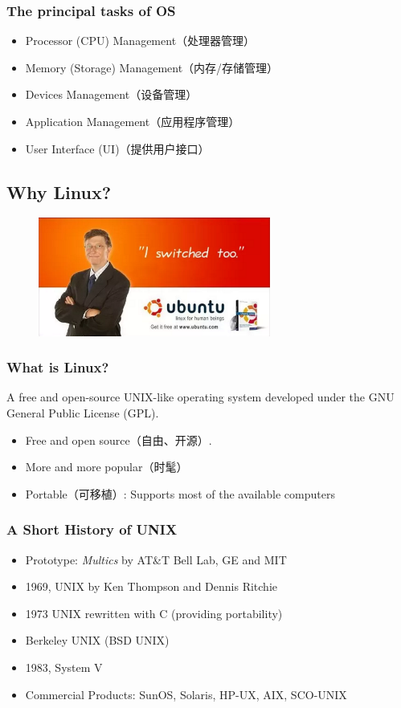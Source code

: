 \documentclass[red]{beamer}
\begin{document}
\begin{CJK*}{UTF8}{gbsn}
\begin{frame}
\frametitle{The principal tasks of OS}
\begin{itemize}
    \item Processor (CPU) Management（处理器管理）
    \item Memory (Storage) Management（内存/存储管理）
    \item Devices Management（设备管理）
    \item Application Management（应用程序管理）
    \item User Interface (UI)（提供用户接口）
\end{itemize}
\end{frame}

\subsection{Why Linux?}

\begin{frame}
\begin{figure}[h]
\includegraphics[width=3in]{images/gates.png}
\end{figure}
\end{frame}

\begin{frame}
\frametitle{What is Linux?}
A free and open-source UNIX-like operating system developed under 
the GNU General Public License (GPL).
\begin{itemize}
    \item Free and open source（自由、开源）.
    \item More and more popular（时髦）
    \item Portable（可移植）: Supports most of the available computers
\end{itemize}
\end{frame}

\begin{frame}
\frametitle{A Short History of UNIX}
\begin{itemize}
    \item Prototype: \emph{Multics} by AT\&T Bell Lab, GE and MIT
    \item 1969, UNIX by Ken Thompson and Dennis Ritchie
    \item 1973 UNIX rewritten with C (providing portability)
    \item Berkeley UNIX (BSD UNIX)
    \item 1983, System V
    \item Commercial Products: SunOS, Solaris, HP-UX, AIX, SCO-UNIX
\end{itemize}
\end{frame}


\end{CJK*}
\end{document}
